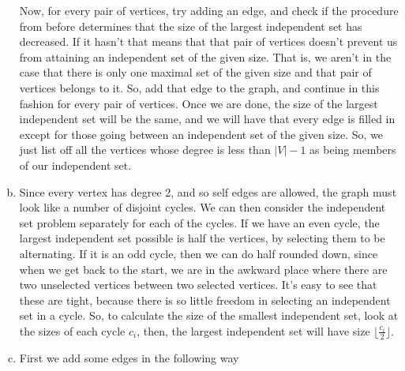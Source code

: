 \documentclass{article}
\begin{document}
\begin{enumerate}[a)]
Now, for every pair of vertices, try adding an edge, and check if the procedure from before determines that the size of the largest independent set has decreased. If it hasn't that means that that pair of vertices doesn't prevent us from attaining an independent set of the given size. That is, we aren't in the case that there is only one maximal set of the given size and that pair of vertices belongs to it. So, add that edge to the graph, and continue in this fashion for every pair of vertices. Once we are done, the size of the largest independent set will be the same, and we will have that every edge is filled in except for those going between an independent set of the given size. So, we just list off all the vertices whose degree is less than $|V|-1$ as being members of our independent set.
\item
Since every vertex has degree 2, and so self edges are allowed, the graph must look like a number of disjoint cycles. We can then consider the independent set problem separately for each of the cycles. If we have an even cycle, the largest independent set possible is half the vertices, by selecting them to be alternating. If it is an odd cycle, then we can do half rounded down, since when we get back to the start, we are in the awkward place where there are two unselected vertices between two selected vertices. It's easy to see that these are tight, because there is so little freedom in selecting an independent set in a cycle. So, to calculate the size of the smallest independent set, look at the sizes of each cycle $c_i$, then, the largest independent set will have size $\lfloor \frac{c_i}{2}\rfloor$.
\item
First we add some edges in the following way
\end{enumerate}
\end{document}
